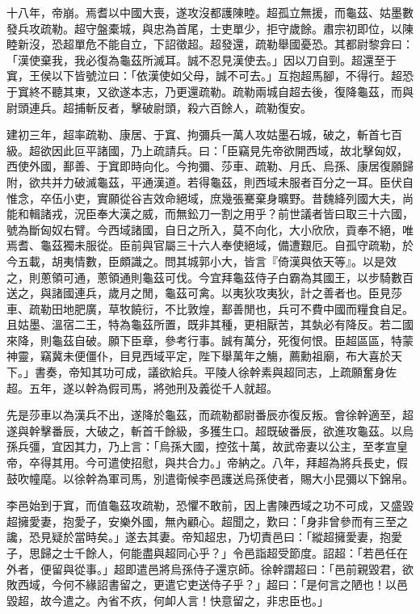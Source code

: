 \begin{pinyinscope}
十八年，帝崩。焉耆以中國大喪，遂攻沒都護陳睦。超孤立無援，而龜茲、姑墨數發兵攻疏勒。超守盤橐城，與忠為首尾，士吏單少，拒守歲餘。肅宗初即位，以陳睦新沒，恐超單危不能自立，下詔徵超。超發還，疏勒舉國憂恐。其都尉黎弇曰：「漢使棄我，我必復為龜茲所滅耳。誠不忍見漢使去。」因以刀自剄。超還至于窴，王侯以下皆號泣曰：「依漢使如父母，誠不可去。」互抱超馬腳，不得行。超恐于窴終不聽其東，又欲遂本志，乃更還疏勒。疏勒兩城自超去後，復降龜茲，而與尉頭連兵。超捕斬反者，擊破尉頭，殺六百餘人，疏勒復安。

建初三年，超率疏勒、康居、于窴、拘彌兵一萬人攻姑墨石城，破之，斬首七百級。超欲因此叵平諸國，乃上疏請兵。曰：「臣竊見先帝欲開西域，故北擊匈奴，西使外國，鄯善、于窴即時向化。今拘彌、莎車、疏勒、月氏、烏孫、康居復願歸附，欲共并力破滅龜茲，平通漢道。若得龜茲，則西域未服者百分之一耳。臣伏自惟念，卒伍小吏，實願從谷吉效命絕域，庶幾張騫棄身曠野。昔魏絳列國大夫，尚能和輯諸戎，況臣奉大漢之威，而無鈆刀一割之用乎？前世議者皆曰取三十六國，號為斷匈奴右臂。今西域諸國，自日之所入，莫不向化，大小欣欣，貢奉不絕，唯焉耆、龜茲獨未服從。臣前與官屬三十六人奉使絕域，備遭艱厄。自孤守疏勒，於今五載，胡夷情數，臣頗識之。問其城郭小大，皆言『倚漢與依天等』。以是效之，則蔥領可通，蔥領通則龜茲可伐。今宜拜龜茲侍子白霸為其國王，以步騎數百送之，與諸國連兵，歲月之閒，龜茲可禽。以夷狄攻夷狄，計之善者也。臣見莎車、疏勒田地肥廣，草牧饒衍，不比敦煌，鄯善閒也，兵可不費中國而糧食自足。且姑墨、溫宿二王，特為龜茲所置，既非其種，更相厭苦，其埶必有降反。若二國來降，則龜茲自破。願下臣章，參考行事。誠有萬分，死復何恨。臣超區區，特蒙神靈，竊冀未便僵仆，目見西域平定，陛下舉萬年之觴，薦勳祖廟，布大喜於天下。」書奏，帝知其功可成，議欲給兵。平陵人徐幹素與超同志，上疏願奮身佐超。五年，遂以幹為假司馬，將弛刑及義從千人就超。

先是莎車以為漢兵不出，遂降於龜茲，而疏勒都尉番辰亦復反叛。會徐幹適至，超遂與幹擊番辰，大破之，斬首千餘級，多獲生口。超既破番辰，欲進攻龜茲。以烏孫兵彊，宜因其力，乃上言：「烏孫大國，控弦十萬，故武帝妻以公主，至孝宣皇帝，卒得其用。今可遣使招慰，與共合力。」帝納之。八年，拜超為將兵長史，假鼓吹幢麾。以徐幹為軍司馬，別遣衛候李邑護送烏孫使者，賜大小昆彌以下錦帛。

李邑始到于窴，而值龜茲攻疏勒，恐懼不敢前，因上書陳西域之功不可成，又盛毀超擁愛妻，抱愛子，安樂外國，無內顧心。超聞之，歎曰：「身非曾參而有三至之讒，恐見疑於當時矣。」遂去其妻。帝知超忠，乃切責邑曰：「縱超擁愛妻，抱愛子，思歸之士千餘人，何能盡與超同心乎？」令邑詣超受節度。詔超：「若邑任在外者，便留與從事。」超即遣邑將烏孫侍子還京師。徐幹謂超曰：「邑前親毀君，欲敗西域，今何不緣詔書留之，更遣它吏送侍子乎？」超曰：「是何言之陋也！以邑毀超，故今遣之。內省不疚，何卹人言！快意留之，非忠臣也。」


\end{pinyinscope}
